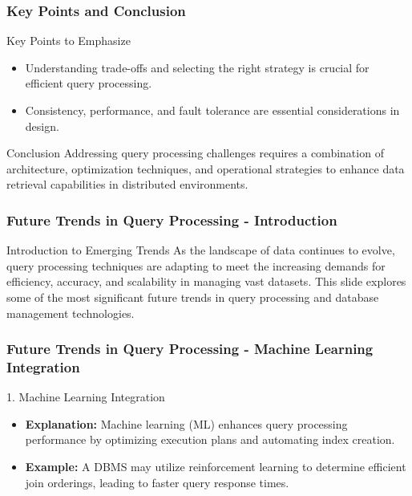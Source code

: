 \documentclass[aspectratio=169]{beamer}
\begin{document}
\begin{frame}[fragile]
    \frametitle{Key Points and Conclusion}
    
    \begin{block}{Key Points to Emphasize}
        \begin{itemize}
            \item Understanding trade-offs and selecting the right strategy is crucial for efficient query processing.
            \item Consistency, performance, and fault tolerance are essential considerations in design.
        \end{itemize}
    \end{block}
    
    \begin{block}{Conclusion}
        Addressing query processing challenges requires a combination of architecture, optimization techniques, and operational strategies to enhance data retrieval capabilities in distributed environments.
    \end{block}
\end{frame}

\begin{frame}[fragile]
    \frametitle{Future Trends in Query Processing - Introduction}
    \begin{block}{Introduction to Emerging Trends}
        As the landscape of data continues to evolve, query processing techniques are adapting to meet the increasing demands for efficiency, accuracy, and scalability in managing vast datasets. This slide explores some of the most significant future trends in query processing and database management technologies.
    \end{block}
\end{frame}

\begin{frame}[fragile]
    \frametitle{Future Trends in Query Processing - Machine Learning Integration}
    \begin{block}{1. Machine Learning Integration}
        \begin{itemize}
            \item \textbf{Explanation:} Machine learning (ML) enhances query processing performance by optimizing execution plans and automating index creation.
            \item \textbf{Example:} 
                A DBMS may utilize reinforcement learning to determine efficient join orderings, leading to faster query response times.
        \end{itemize}
    \end{block}
\end{frame}
\end{document}
